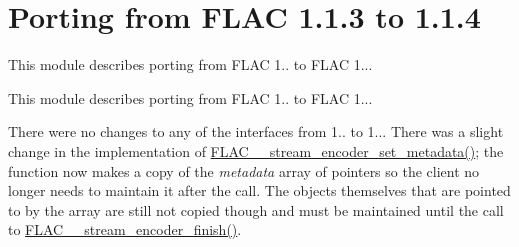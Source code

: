 \hypertarget{group__porting__1__1__3__to__1__1__4}{}\section{Porting from F\+L\+AC 1.1.3 to 1.1.4}
\label{group__porting__1__1__3__to__1__1__4}


This module describes porting from F\+L\+AC 1.. to F\+L\+AC 1...  


This module describes porting from F\+L\+AC 1.. to F\+L\+AC 1... 

There were no changes to any of the interfaces from 1.. to 1... There was a slight change in the implementation of \mbox{\hyperlink{group__flac__stream__encoder_ga67b30b1a67a9274f7708a22154b225f6}{F\+L\+A\+C\+\_\+\+\_\+stream\+\_\+encoder\+\_\+set\+\_\+metadata()}}; the function now makes a copy of the {\itshape metadata} array of pointers so the client no longer needs to maintain it after the call. The objects themselves that are pointed to by the array are still not copied though and must be maintained until the call to \mbox{\hyperlink{group__flac__stream__encoder_gab2c1e5477c1e3fe9ad0d722ff8eecda2}{F\+L\+A\+C\+\_\+\+\_\+stream\+\_\+encoder\+\_\+finish()}}. 